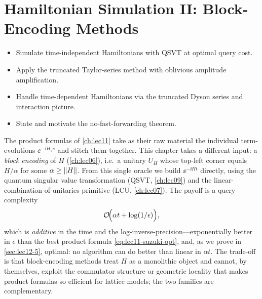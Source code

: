 \chapter{Hamiltonian Simulation II: Block-Encoding Methods}
\label{ch:lec12}

\begin{objectives}
\begin{itemize}[leftmargin=1.4em,nosep]
  \item Simulate time-independent Hamiltonians with QSVT at optimal query cost.
  \item Apply the truncated Taylor-series method with oblivious amplitude amplification.
  \item Handle time-dependent Hamiltonians via the truncated Dyson series and interaction picture.
  \item State and motivate the no-fast-forwarding theorem.
\end{itemize}
\end{objectives}

The product formulas of \cref{ch:lec11} take as their raw material the individual
term-evolutions $\ee^{-\ii H_\gamma s}$ and stitch them together. This chapter takes a
different input: a \emph{block encoding} of $H$ (\cref{ch:lec06}), i.e.\ a unitary $U_H$
whose top-left corner equals $H/\alpha$ for some $\alpha\ge\left\lVert H \right\rVert$. From this single
oracle we build $\ee^{-\ii Ht}$ directly, using the quantum singular value transformation
(QSVT, \cref{ch:lec09}) and the linear-combination-of-unitaries primitive (LCU,
\cref{ch:lec07}). The payoff is a query complexity
\begin{equation}
  \mathcal{O}\!\Bigl(\alpha t+\log(1/\epsilon)\Bigr),
  \label{eq:lec12-optimal}
\end{equation}
which is \emph{additive} in the time and the log-inverse-precision---exponentially better
in $\epsilon$ than the best product formula \eqref{eq:lec11-suzuki-opt}, and, as we prove
in \cref{sec:lec12-5}, optimal: no algorithm can do better than linear in $\alpha t$. The
trade-off is that block-encoding methods treat $H$ as a monolithic object and cannot, by
themselves, exploit the commutator structure or geometric locality that makes product
formulas so efficient for lattice models; the two families are complementary.

